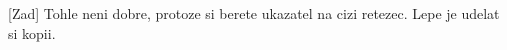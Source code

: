 
\begin{DoxyRefList}
\item[\label{bug__bug000001}%
\Hypertarget{bug__bug000001}%
Member \hyperlink{struct_c_value___t_student_1_1_t_student_ae052eac687165ae925ca2a15bccc9d95}{C\+Value\+\_\+\+T\+Student\+:\+:T\+Student\+:\+:T\+Student} (char $\ast$a\+Fisrt\+Name, char $\ast$a\+Last\+Name, int a\+Vut\+ID)]\mbox{[}Zad\mbox{]} Tohle neni dobre, protoze si berete ukazatel na cizi retezec. Lepe je udelat si kopii. 
\end{DoxyRefList}